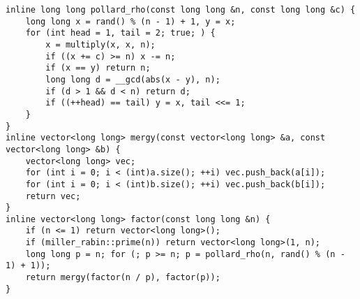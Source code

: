 \begin{lstlisting}
inline long long pollard_rho(const long long &n, const long long &c) {
	long long x = rand() % (n - 1) + 1, y = x;
	for (int head = 1, tail = 2; true; ) {
		x = multiply(x, x, n);
		if ((x += c) >= n) x -= n;
		if (x == y) return n;
		long long d = __gcd(abs(x - y), n);
		if (d > 1 && d < n) return d;
		if ((++head) == tail) y = x, tail <<= 1;
	}
}
inline vector<long long> mergy(const vector<long long> &a, const vector<long long> &b) {
	vector<long long> vec;
	for (int i = 0; i < (int)a.size(); ++i) vec.push_back(a[i]);
	for (int i = 0; i < (int)b.size(); ++i) vec.push_back(b[i]);
	return vec;
}
inline vector<long long> factor(const long long &n) {
	if (n <= 1) return vector<long long>();
	if (miller_rabin::prime(n)) return vector<long long>(1, n);
	long long p = n; for (; p >= n; p = pollard_rho(n, rand() % (n - 1) + 1));
	return mergy(factor(n / p), factor(p));
}
\end{lstlisting}